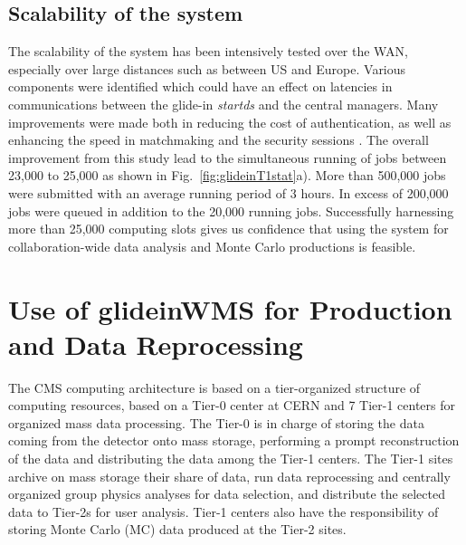 \documentclass[a4paper]{jpconf}
\begin{document}
\subsection {Scalability of the system}
The scalability of the system has been intensively tested over the WAN, especially over large distances such 
as between US and Europe. Various components were identified which could have an effect on
latencies in communications between the glide-in \emph{startds} and the central managers. Many improvements were
made both in reducing the cost of authentication, as well as enhancing the speed in matchmaking and 
the security sessions \cite{bib:scalability}. The overall improvement 
from this study lead to the simultaneous running of jobs between 23,000 to 25,000 as shown in Fig.~\ref{fig:glideinT1stat}a).
More than 500,000 jobs were submitted with an average running period of 3 hours. In excess of  200,000 jobs were queued in addition to the
20,000 running jobs. Successfully harnessing more than 25,000 computing slots gives us confidence that using the system for collaboration-wide 
data analysis and Monte Carlo productions is feasible.
\section{Use of glideinWMS for Production and Data Reprocessing }
The CMS computing architecture \cite{bib:cms_computing_arch} is based on a tier-organized structure of computing
resources, based on a Tier-0 center at CERN and 7 Tier-1 centers for organized mass data processing. 
The Tier-0 is in charge of storing the data coming from the detector onto mass storage, performing a prompt 
reconstruction of the data and distributing the data among the Tier-1 centers. The Tier-1 sites archive on
mass storage their share of data, run data reprocessing and centrally organized group physics analyses for data selection, 
and distribute the selected data to Tier-2s for user analysis. Tier-1 centers also
have the responsibility of storing Monte Carlo (MC) data produced at the Tier-2 sites. 
\end{document}
